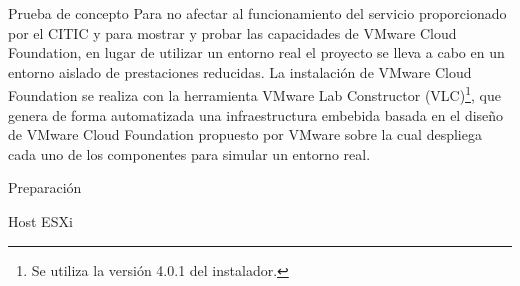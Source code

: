 \begin{section}{Prueba de concepto}
Para no afectar al funcionamiento del servicio proporcionado por el CITIC y para mostrar y probar las capacidades de VMware Cloud Foundation, en lugar de utilizar un entorno real el proyecto se lleva a cabo en un entorno aislado de prestaciones reducidas. La instalación de VMware Cloud Foundation se realiza con la herramienta VMware Lab Constructor (VLC)\footnote{Se utiliza la versión 4.0.1 del instalador.}, que genera de forma automatizada una infraestructura embebida basada en el diseño de VMware Cloud Foundation propuesto por VMware sobre la cual despliega cada uno de los componentes para simular un entorno real.

\begin{subsection}{Preparación}
  \begin{subsubsection}{Host ESXi}  
  

\end{subsubsection}
\end{subsection}
\end{section}
